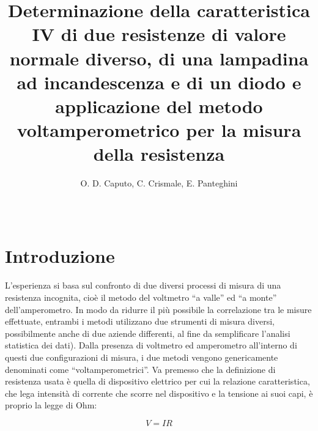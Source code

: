 \documentclass{article}
\title{Determinazione della caratteristica IV di due
resistenze di valore normale diverso, di una
lampadina ad incandescenza e di un diodo e
applicazione del metodo voltamperometrico per la
misura della resistenza}
\author{O. D. Caputo, C. Crismale, E. Panteghini}
\date{~}
\begin{document}
\maketitle

\section{Introduzione}
L’esperienza si basa sul confronto di due diversi processi di misura di una resistenza
incognita, cioè il metodo del voltmetro “a valle” ed “a monte” dell’amperometro. In modo da ridurre il più possibile la correlazione tra le misure effettuate, entrambi i metodi utilizzano due strumenti
di misura diversi, possibilmente anche di due aziende differenti, al fine da semplificare l’analisi statistica dei dati). Dalla presenza di voltmetro ed amperometro all'interno di questi due configurazioni di misura, i due metodi vengono genericamente
denominati come “voltamperometrici”.
Va premesso che la definizione di resistenza usata è quella di dispositivo
elettrico per cui la relazione caratteristica, che lega intensità di corrente che
scorre nel dispositivo e la tensione ai suoi capi, è proprio la legge di Ohm:

\begin{equation}
    V = IR
\end{equation}
\end{document}
